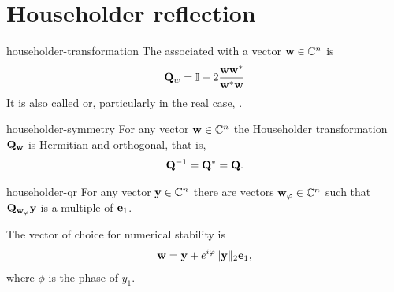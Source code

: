   
    

\section{Householder reflection}

\begin{Definition}{householder-transformation}
  The 
  associated with a vector $\mathbf w\in\mathbb C^n$ is
  \begin{gather}
    \mathbf Q_w = \mathbb I - 2\frac{\mathbf w\mathbf w^*}{\mathbf w^*\mathbf w}
  \end{gather}
  It is also called  or, particularly in
  the real case, .
\end{Definition}

\begin{Lemma}{householder-symmetry}
  For any vector $\mathbf w\in\mathbb C^n$ the Householder transformation
  $\mathbf Q_{\mathbf w}$ is Hermitian and orthogonal, that is,
  \begin{gather}
    \mathbf Q^{-1} = \mathbf Q^* = \mathbf Q.
  \end{gather}
\end{Lemma}

\begin{Lemma}{householder-qr}
  For any vector $\mathbf y\in\mathbb C^n$ there are vectors $\mathbf w_\varphi\in\mathbb C^n$ such
  that $\mathbf Q_{\mathbf w_\varphi} \mathbf y$ is a multiple of $\mathbf e_1$.

  The vector of choice for numerical stability is
  \begin{gather}
    \mathbf w = \mathbf y + e^{i\varphi} \lVert\mathbf y\rVert_2\mathbf e_1,
  \end{gather}
  where $\phi$ is the phase of $y_1$.
\end{Lemma}

